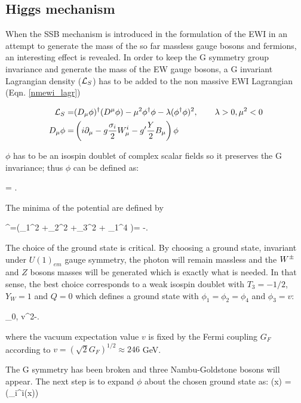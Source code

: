 \subsection{Higgs mechanism}

\noindent When the SSB mechanism is introduced in the formulation of the EWI in an attempt to generate the mass of the so far massless gauge bosons and fermions, an interesting effect is revealed. In order to keep the G symmetry group invariance and generate the mass of the EW gauge bosons, a G invariant Lagrangian density ($\mathcal{L}_S$) has to be added to the non massive EWI Lagrangian (Eqn. \ref{nmewi_lagr})

\begin{align}
\mathcal{L}_S    = &(D_\mu\phi)^\dagger(D^\mu\phi) - \mu^2\phi^\dagger\phi - \lambda(\phi^\dagger\phi)^2 , \qquad \lambda>0, \mu^2<0 \label{ls}\\
D_\mu\phi = &\left(i\partial_\mu - g\frac{\sigma_i}{2}W^i_\mu -
g'\frac{Y}{2}B_\mu\right)\phi
\end{align}

\noindent $\phi$ has to be an isospin doublet of complex scalar fields so it preserves the G invariance; thus $\phi$ can be defined as:

\beqn
\phi =  \equiv {}.
\eeqn

The minima of the potential are defined by

\beqn
\phi^\dagger\phi=(\phi_1^2 +\phi_2^2 +\phi_3^2 + \phi_1^4 )= -.
\eeqn

The choice of the ground state is critical. By choosing a ground state, invariant under $U(1)_{em}$ gauge symmetry, the photon will remain massless and the $W^\pm$ and $Z$ bosons masses will be generated which is exactly what is needed. In that sense, the best choice corresponds to a weak isospin doublet with $T_3=-1/2$, $Y_W=1$ and $Q=0$ which defines a ground state with $\phi_1=\phi_2=\phi_4$ and $\phi_3=v$:

\beqn\label{field_exp}
\phi_0\equiv{}, \qquad v^2\equiv-.
\eeqn

\noindent where the vacuum expectation value $v$ is fixed by the Fermi coupling $G_F$ according to $v=(\sqrt{2}G_F)^{1/2}\approx 246$ GeV.

The G symmetry has been broken and three Nambu-Goldstone bosons will appear. The next step is to expand $\phi$ about the chosen ground state as:
\beqn
\phi(x) = \exp\left(\sigma_i\theta^i(x)\right) \approx {} 
\eeqn

